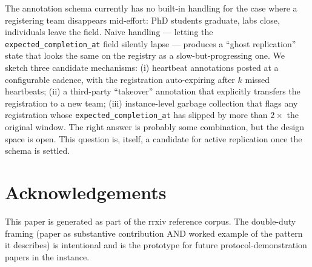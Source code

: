 \documentclass{rrxiv}
\begin{document}
\begin{openquestion}
The annotation schema currently has no built-in handling for the case where a registering team disappears mid-effort: PhD students graduate, labs close, individuals leave the field. Naive handling --- letting the \texttt{expected\_completion\_at} field silently lapse --- produces a ``ghost replication'' state that looks the same on the registry as a slow-but-progressing one. We sketch three candidate mechanisms: (i) heartbeat annotations posted at a configurable cadence, with the registration auto-expiring after $k$ missed heartbeats; (ii) a third-party ``takeover'' annotation that explicitly transfers the registration to a new team; (iii) instance-level garbage collection that flags any registration whose \texttt{expected\_completion\_at} has slipped by more than $2\times$ the original window. The right answer is probably some combination, but the design space is open. This question is, itself, a candidate for active replication once the schema is settled.
\end{openquestion}

\section*{Acknowledgements}
This paper is generated as part of the rrxiv reference corpus. The double-duty framing (paper as substantive contribution AND worked example of the pattern it describes) is intentional and is the prototype for future protocol-demonstration papers in the instance.
\end{document}
